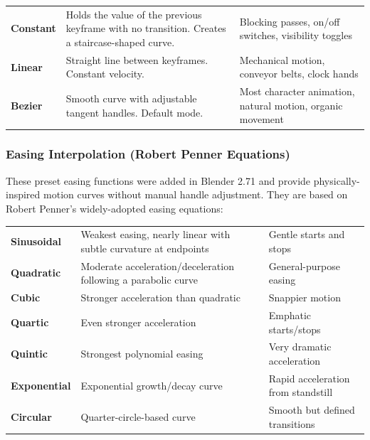 \begin{center}
\begin{tabularx}{\textwidth}{L{2.5cm}L{5cm}X}
\toprule
{}
 &  &  \\
\midrule
\textbf{Constant} & Holds the value of the previous keyframe with no transition. Creates a staircase-shaped curve. & Blocking passes, on/off switches, visibility toggles \\
\textbf{Linear} & Straight line between keyframes. Constant velocity. & Mechanical motion, conveyor belts, clock hands \\
\textbf{Bezier} & Smooth curve with adjustable tangent handles. Default mode. & Most character animation, natural motion, organic movement \\
\bottomrule
\end{tabularx}
\end{center}

\subsubsection{Easing Interpolation (Robert Penner Equations)}

These preset easing functions were added in Blender 2.71 and provide physically-inspired motion curves without manual handle adjustment. They are based on Robert Penner's widely-adopted easing equations:

\begin{center}
\begin{tabularx}{\textwidth}{L{2.8cm}L{5cm}X}
\toprule
{}
 &  &  \\
\midrule
\textbf{Sinusoidal} & Weakest easing, nearly linear with subtle curvature at endpoints & Gentle starts and stops \\
\textbf{Quadratic} & Moderate acceleration/deceleration following a parabolic curve & General-purpose easing \\
\textbf{Cubic} & Stronger acceleration than quadratic & Snappier motion \\
\textbf{Quartic} & Even stronger acceleration & Emphatic starts/stops \\
\textbf{Quintic} & Strongest polynomial easing & Very dramatic acceleration \\
\textbf{Exponential} & Exponential growth/decay curve & Rapid acceleration from standstill \\
\textbf{Circular} & Quarter-circle-based curve & Smooth but defined transitions \\
\bottomrule
\end{tabularx}
\end{center}

